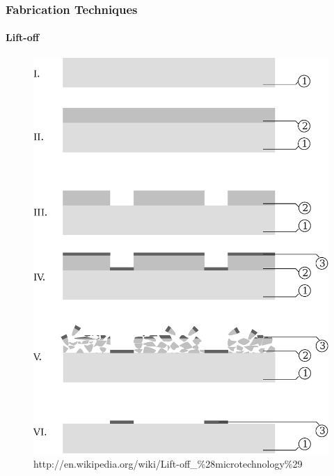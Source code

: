 \documentclass{beamer}
\begin{document}

\begin{frame}
    \frametitle{Fabrication Techniques}
    \framesubtitle{Lift-off}
    \begin{figure}[!htb]
        \centering
        \includegraphics[height=0.6\textheight]{img/lift-off.eps}
        \caption{http://en.wikipedia.org/wiki/Lift-off\_\%28microtechnology\%29}
    \end{figure}
\end{frame}

\end{document}
